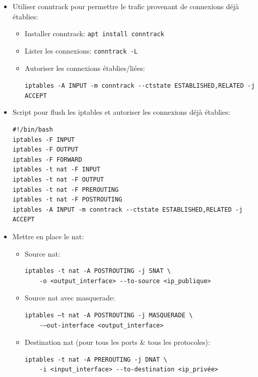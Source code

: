 \documentclass[a4paper]{article}
\begin{document}
\begin{itemize}
\item Utiliser conntrack pour permettre le trafic provenant de connexions déjà établies:
\begin{example} \begin{itemize}
    \item Installer conntrack: \texttt{apt install conntrack}
    \item Lister les connexions: \texttt{conntrack -L}
    \item Autoriser les connexions établies/liées:
    \begin{example}
        \texttt{iptables -A INPUT -m conntrack -{}-ctstate ESTABLISHED,RELATED -j ACCEPT}
    \end{example}
\end{itemize} \end{example}


\item Script pour flush les iptables et autoriser les connexions déjà établies:
\begin{example} \begin{verbatim}
#!/bin/bash
iptables -F INPUT
iptables -F OUTPUT
iptables -F FORWARD
iptables -t nat -F INPUT
iptables -t nat -F OUTPUT
iptables -t nat -F PREROUTING
iptables -t nat -F POSTROUTING
iptables -A INPUT -m conntrack --ctstate ESTABLISHED,RELATED -j ACCEPT
\end{verbatim} \end{example}


\item Mettre en place le nat:
\begin{example} \begin{itemize}

\item Source nat:
\begin{example} \begin{verbatim}
iptables -t nat -A POSTROUTING -j SNAT \
    -o <output_interface> --to-source <ip_publique>
\end{verbatim} \end{example}

\item Source nat avec masquerade:
\begin{example} \begin{verbatim}
iptables –t nat -A POSTROUTING -j MASQUERADE \
    -–out-interface <output_interface>
\end{verbatim} \end{example}

\item Destination nat (pour tous les ports \& tous les protocoles):
\begin{example} \begin{verbatim}
iptables -t nat -A PREROUTING -j DNAT \
    -i <input_interface> --to-destination <ip_privée>
\end{verbatim} \end{example}


\end{itemize}
\end{example}
\end{itemize}
\end{document}
